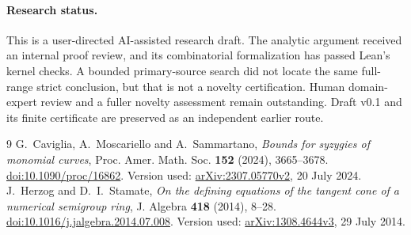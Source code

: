 \documentclass[11pt,a4paper]{article}
\begin{document}
\paragraph{Research status.}
This is a user-directed AI-assisted research draft. The analytic argument received an internal proof review, and its combinatorial formalization has passed Lean's kernel checks. A bounded primary-source search did not locate the same full-range strict conclusion, but that is not a novelty certification. Human domain-expert review and a fuller novelty assessment remain outstanding. Draft v0.1 and its finite certificate are preserved as an independent earlier route.

\begin{thebibliography}{9}
 G.~Caviglia, A.~Moscariello and A.~Sammartano,
\emph{Bounds for syzygies of monomial curves},
Proc. Amer. Math. Soc. \textbf{152} (2024), 3665--3678.
\href{https://doi.org/10.1090/proc/16862}{doi:10.1090/proc/16862}.
Version used: \href{https://arxiv.org/abs/2307.05770v2}{arXiv:2307.05770v2}, 20 July 2024.
 J.~Herzog and D.~I.~Stamate,
\emph{On the defining equations of the tangent cone of a numerical semigroup ring},
J. Algebra \textbf{418} (2014), 8--28.
\href{https://doi.org/10.1016/j.jalgebra.2014.07.008}{doi:10.1016/j.jalgebra.2014.07.008}.
Version used: \href{https://arxiv.org/abs/1308.4644v3}{arXiv:1308.4644v3}, 29 July 2014.
\end{thebibliography}
\end{document}
